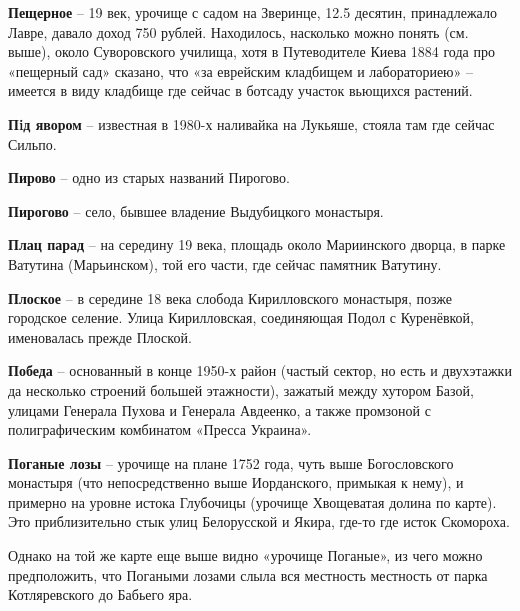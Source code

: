 
\textbf{Пещерное} – 19 век, урочище с садом на Зверинце, 12.5 десятин, принадлежало Лавре, давало доход 750 рублей. Находилось, насколько можно понять (см. выше), около Суворовского училища, хотя в Путеводителе Киева 1884 года про «пещерный сад» сказано, что «за еврейским кладбищем и лабораториею» – имеется в виду кладбище где сейчас в ботсаду участок вьющихся растений.\\

\medskip

\textbf{Пiд явором} – известная в 1980-х наливайка на Лукьяше, стояла там где сейчас Сильпо.\\


\medskip

\textbf{Пирово} – одно из старых названий Пирогово.\\


\medskip

\textbf{Пирогово} – село, бывшее владение Выдубицкого монастыря.\\


\medskip

\textbf{Плац парад} – на середину 19 века, площадь около Мариинского дворца, в парке Ватутина (Марьинском), той его части, где сейчас памятник Ватутину.\\


\medskip

\textbf{Плоское} – в середине 18 века слобода Кирилловского монастыря, позже городское селение. Улица Кирилловская, соединяющая Подол с Куренёвкой, именовалась прежде Плоской.\\


\medskip

\textbf{Победа} – основанный в конце 1950-х район (частый сектор, но есть и двухэтажки да несколько строений большей этажности), зажатый между хутором Базой, улицами Генерала Пухова и Генерала Авдеенко, а также промзоной с полиграфическим комбинатом «Пресса Украина».\\ 


\medskip

\textbf{Поганые лозы} – урочище на плане 1752 года, чуть выше Богословского монастыря (что непосредственно выше Иорданского, примыкая к нему), и примерно на уровне истока Глубочицы (урочище Хвощеватая долина по карте). Это приблизительно стык улиц Белорусской и Якира, где-то где исток Скомороха.
  
   Однако на той же карте еще выше видно «урочище Поганые», из чего можно предположить, что Погаными лозами слыла вся местность местность от парка Котляревского до Бабьего яра.

